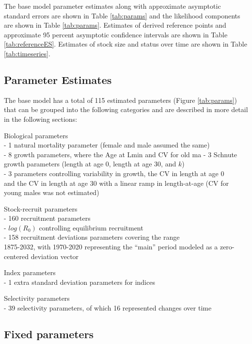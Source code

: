 \documentclass[
  english,
  a4paper,
]{article}
\begin{document}
The base model parameter estimates along with approximate asymptotic standard errors are shown in Table \ref{tab:params} and the likelihood components are shown in Table \ref{tab:params}. Estimates of derived reference points and approximate 95 percent asymptotic confidence intervals are shown in Table \ref{tab:referenceES}. Estimates of stock size and status over time are shown in Table \ref{tab:timeseries}.

\hypertarget{parameter-estimates}{%
\subsection{Parameter Estimates}\label{parameter-estimates}}

The base model has a total of 115 estimated parameters
(Figure \ref{tab:params}) that can be grouped into the following
categories and are described in more detail in the following sections:

Biological parameters\\
- 1 natural mortality parameter (female and male assumed the same)\\
- 8 growth parameters, where the Age at Lmin and CV for old ma
- 3 Schnute growth parameters (length at age 0, length at age 30, and \(k\))\\
- 3 parameters controlling variability in growth, the CV in length at age 0\\
and the CV in length at age 30 with a linear ramp in length-at-age (CV for young males was not estimated)

Stock-recruit parameters\\
- 160 recruitment parameters\\
- \(log(R_0)\) controlling equilibrium recruitment\\
- 158 recruitment deviations parameters covering the range\\
1875-2032, with
1970-2020
representing the ``main'' period modeled as a zero-centered deviation vector

Index parameters\\
- 1 extra standard deviation parameters
for indices

Selectivity parameters\\
- 39 selectivity parameters, of which
16 represented changes over time

\hypertarget{fixed-parameters}{%
\subsection{Fixed parameters}\label{fixed-parameters}}
\end{document}
